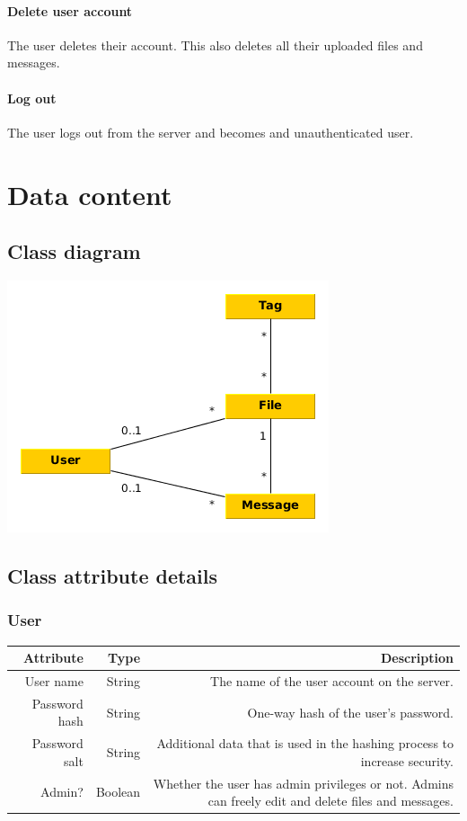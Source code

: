 \documentclass[10pt,a4paper]{article}
\begin{document}
\paragraph{Delete user account}
The user deletes their account. This also deletes all their uploaded files and messages.
\paragraph{Log out}
The user logs out from the server and becomes and unauthenticated user.


\section{Data content}
\subsection{Class diagram}
\includegraphics[scale=0.7]{diagrams/class.png}
\subsection{Class attribute details}
\subsubsection{User}
\begin{tabularx}{\textwidth}{|R|R|R|} \hline
\textbf{Attribute} & \textbf{Type} & \textbf{Description}\\ \hline
User name & String & The name of the user account on the server.\\ \hline
Password hash & String & One-way hash of the user's password.\\ \hline
Password salt & String & Additional data that is used in the hashing process to increase security.\\ \hline
Admin? & Boolean & Whether the user has admin privileges or not. Admins can freely edit and delete files and messages.\\ \hline
\end{tabularx}
\end{document}
